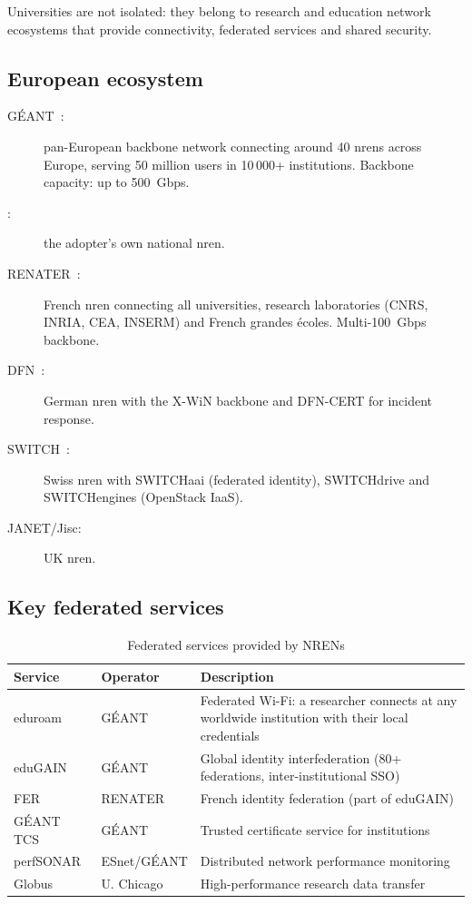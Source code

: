 Universities are not isolated: they belong to research and
education network ecosystems that provide connectivity,
federated services and shared security.

\subsection{European ecosystem}

\begin{description}
    \item[GÉANT~\cite{geant}:] pan-European backbone network connecting
    around 40 \gls{nren}s across Europe, serving 50 million users
    in 10\,000+ institutions. Backbone capacity: up to 500~Gbps.
    \item[:] the adopter's own national \gls{nren}.
    \item[RENATER~\cite{renater}:] French \gls{nren} connecting all
    universities, research laboratories (CNRS, INRIA, CEA, INSERM)
    and French grandes écoles. Multi-100~Gbps backbone.
    \item[DFN~\cite{dfn}:] German \gls{nren} with the X-WiN backbone and DFN-CERT for
    incident response.
    \item[SWITCH~\cite{switch-nren}:] Swiss \gls{nren} with SWITCHaai (federated identity),
    SWITCHdrive and SWITCHengines (OpenStack IaaS).
    \item[JANET/Jisc:] UK \gls{nren}.
\end{description}

\subsection{Key federated services}

\begin{table}[H]
\centering
\caption{Federated services provided by NRENs}
\label{tab:nren-services}
\small
\begin{tabularx}{\textwidth}{l l X}
\toprule
\textbf{Service} & \textbf{Operator} & \textbf{Description} \\
\midrule
eduroam~\cite{eduroam} & GÉANT & Federated Wi-Fi: a researcher
    connects at any worldwide institution with their local credentials \\
\addlinespace
eduGAIN~\cite{edugain} & GÉANT & Global identity interfederation
    (80+ federations, inter-institutional SSO) \\
\addlinespace
FER & RENATER & French identity federation (part of eduGAIN) \\
\addlinespace
GÉANT TCS & GÉANT & Trusted certificate service for
    institutions \\
\addlinespace
perfSONAR~\cite{perfsonar} & ESnet/GÉANT & Distributed network
    performance monitoring \\
\addlinespace
Globus~\cite{globus} & U. Chicago & High-performance research data
    transfer \\
\bottomrule
\end{tabularx}
\end{table}

